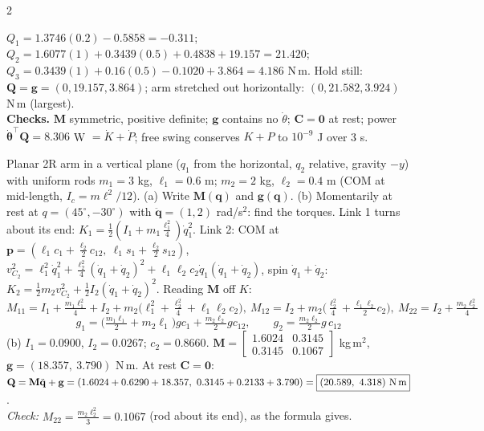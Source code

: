 \begin{multicols}{2}
\begin{examq}
$Q_1=1.3746(0.2)-0.5858=\boxed{-0.311}$; $Q_2=1.6077(1)+0.3439(0.5)+0.4838+19.157=\boxed{21.420}$; $Q_3=0.3439(1)+0.16(0.5)-0.1020+3.864=\boxed{4.186}$ N\,m. Hold still: $\mathbf Q=\mathbf g=(0,19.157,3.864)$; arm stretched out horizontally: $(0,21.582,3.924)$ N\,m (largest). \chk\\
\textbf{Checks.} $\mathbf M$ symmetric, positive definite; $\mathbf g$ contains no $\dot\theta$; $\mathbf C=\mathbf 0$ at rest; power $\dot{\boldsymbol\theta}^\top\mathbf Q=8.306$ W $=\dot K+\dot P$; free swing conserves $K+P$ to $10^{-9}$ J over 3 s. \chk
\end{examq}


\begin{examq}
Planar 2R arm in a vertical plane ($q_1$ from the horizontal, $q_2$ relative, gravity $-y$) with uniform rods $m_1=3$ kg, $\ell_1=0.6$ m; $m_2=2$ kg, $\ell_2=0.4$ m (COM at mid-length, $I_c=m\ell^2/12$). (a) Write $\mathbf M(\mathbf q)$ and $\mathbf g(\mathbf q)$. (b) Momentarily at rest at $q=(45^\circ,-30^\circ)$ with $\ddot{\mathbf q}=(1,2)$ rad/s$^2$: find the torques.
\solution
Link 1 turns about its end: $K_1=\tfrac12(I_1+m_1\tfrac{\ell_1^2}4)\dot q_1^2$. Link 2: COM at $\mathbf p=(\ell_1c_1+\tfrac{\ell_2}2c_{12},\ \ell_1s_1+\tfrac{\ell_2}2s_{12})$, $v_{C_2}^2=\ell_1^2\dot q_1^2+\tfrac{\ell_2^2}4(\dot q_1+\dot q_2)^2+\ell_1\ell_2c_2\dot q_1(\dot q_1+\dot q_2)$, spin $\dot q_1+\dot q_2$: $K_2=\tfrac12m_2v_{C_2}^2+\tfrac12I_2(\dot q_1+\dot q_2)^2$. Reading $\mathbf M$ off $K$:
\[M_{11}=I_1+\tfrac{m_1\ell_1^2}4+I_2+m_2\big(\ell_1^2+\tfrac{\ell_2^2}4+\ell_1\ell_2c_2\big),\ M_{12}=I_2+m_2\big(\tfrac{\ell_2^2}4+\tfrac{\ell_1\ell_2}2c_2\big),\ M_{22}=I_2+\tfrac{m_2\ell_2^2}4\]
\[g_1=\big(\tfrac{m_1\ell_1}2+m_2\ell_1\big)gc_1+\tfrac{m_2\ell_2}2gc_{12},\qquad g_2=\tfrac{m_2\ell_2}2g\,c_{12}\]
(b) $I_1=0.0900$, $I_2=0.0267$; $c_2=0.8660$. $\mathbf M=\begin{bmatrix}1.6024&0.3145\\0.3145&0.1067\end{bmatrix}$ kg\,m$^2$, $\mathbf g=(18.357,\ 3.790)$ N\,m. At rest $\mathbf C=\mathbf 0$: $\mathbf Q=\mathbf M\ddot{\mathbf q}+\mathbf g=(1.6024+0.6290+18.357,\ 0.3145+0.2133+3.790)=\boxed{(20.589,\ 4.318)\text{ N\,m}}$. \chk\\
\emph{Check:} $M_{22}=\tfrac{m_2\ell_2^2}3=0.1067$ (rod about its end), as the formula gives.
\end{examq}


\end{multicols}

